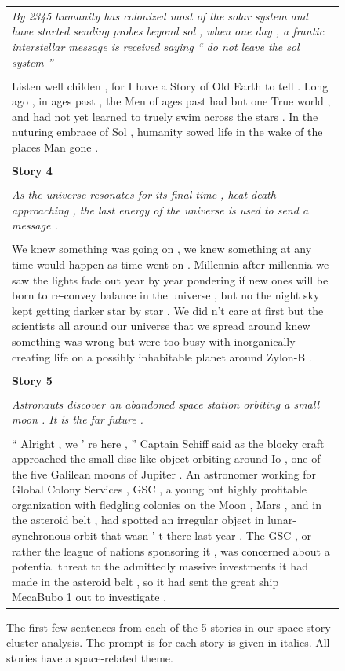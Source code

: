 \documentclass{article}
\begin{document}
\begin{figure}[h]
\begin{tabular}{|p{\textwidth}|}
\textit{By 2345 humanity has colonized most of the solar system and have started sending probes beyond sol , when one day , a frantic interstellar message is received saying `` do not leave the sol system ''}
\\
\\
Listen well childen , for I have a Story of Old Earth to tell .
Long ago , in ages past , the Men of ages past had but one True world , and had not yet learned to truely swim across the stars .
In the nuturing embrace of Sol , humanity sowed life in the wake of the places Man gone .
\\
\\
\hline
\textbf{Story 4}
\\
\hline
\\
\textit{As the universe resonates for its final time , heat death approaching , the last energy of the universe is used to send a message .}
\\
\\
We knew something was going on , we knew something at any time would happen as time went on .
Millennia after millennia we saw the lights fade out year by year pondering if new ones will be born to re-convey balance in the universe , but no the night sky kept getting darker star by star .
We did n't care at first but the scientists all around our universe that we spread around knew something was wrong but were too busy with inorganically creating life on a possibly inhabitable planet around Zylon-B .
\\
\\
\hline
\textbf{Story 5}
\\
\hline
\\
\textit{Astronauts discover an abandoned space station orbiting a small moon . It is the far future .}
\\
\\
“ Alright , we ’ re here , ” Captain Schiff said as the blocky craft approached the small disc-like object orbiting around Io , one of the five Galilean moons of Jupiter .
An astronomer working for Global Colony Services , GSC , a young but highly profitable organization with fledgling colonies on the Moon , Mars , and in the asteroid belt , had spotted an irregular object in lunar-synchronous orbit that wasn ’ t there last year .
The GSC , or rather the league of nations sponsoring it , was concerned about a potential threat to the admittedly massive investments it had made in the asteroid belt , so it had sent the great ship MecaBubo 1 out to investigate .
\\
\hline
\end{tabular}
\caption{
\label{fig:story-starts}
The first few sentences from each of the 5 stories in our space story cluster analysis.
The prompt is for each story is given in italics.
All stories have a space-related theme.
}
\end{figure}
\end{document}
